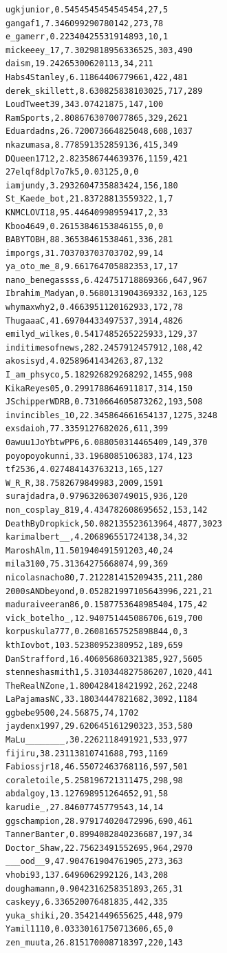 \begin{verbatim}
ugkjunior,0.5454545454545454,27,5
gangaf1,7.346099290780142,273,78
e_gamerr,0.22340425531914893,10,1
mickeeey_17,7.3029818956336525,303,490
daism,19.24265300620113,34,211
Habs4Stanley,6.11864406779661,422,481
derek_skillett,8.630825838103025,717,289
LoudTweet39,343.07421875,147,100
RamSports,2.8086763070077865,329,2621
Eduardadns,26.720073664825048,608,1037
nkazumasa,8.778591352859136,415,349
DQueen1712,2.823586744639376,1159,421
27elqf8dpl7o7k5,0.03125,0,0
iamjundy,3.2932604735883424,156,180
St_Kaede_bot,21.83728813559322,1,7
KNMCLOVI18,95.44640998959417,2,33
Kboo4649,0.26153846153846155,0,0
BABYTOBH,88.36538461538461,336,281
imporgs,31.703703703703702,99,14
ya_oto_me_8,9.661764705882353,17,17
nano_benegassss,6.424751718869366,647,967
Ibrahim_Madyan,0.5680131904369332,163,125
whymaxwhy2,0.4663951120162933,172,78
ThugaaaC,41.69704433497537,3914,4826
emilyd_wilkes,0.5417485265225933,129,37
inditimesofnews,282.2457912457912,108,42
akosisyd,4.02589641434263,87,132
I_am_phsyco,5.182926829268292,1455,908
KikaReyes05,0.2991788646911817,314,150
JSchipperWDRB,0.7310664605873262,193,508
invincibles_10,22.345864661654137,1275,3248
exsdaioh,77.3359127682026,611,399
0awuu1JoYbtwPP6,6.088050314465409,149,370
poyopoyokunni,33.1968085106383,174,123
tf2536,4.027484143763213,165,127
W_R_R,38.7582679849983,2009,1591
surajdadra,0.9796320630749015,936,120
non_cosplay_819,4.434782608695652,153,142
DeathByDropkick,50.082135523613964,4877,3023
karimalbert__,4.206896551724138,34,32
MaroshAlm,11.501940491591203,40,24
mila3100,75.31364275668074,99,369
nicolasnacho80,7.212281415209435,211,280
2000sANDbeyond,0.052821997105643996,221,21
maduraiveeran86,0.1587753648985404,175,42
vick_botelho_,12.940751445086706,619,700
korpuskula777,0.26081657525898844,0,3
kthIovbot,103.52380952380952,189,659
DanStrafford,16.406056860321385,927,5605
stenneshasmith1,5.310344827586207,1020,441
TheRealNZone,1.800428418421992,262,2248
LaPajamasNC,33.18034447821682,3092,1184
ggbebe9500,24.56875,74,1702
jaydenx1997,29.620645161290323,353,580
MaLu________,30.2262118491921,533,977
fijiru,38.23113810741688,793,1169
Fabiossjr18,46.55072463768116,597,501
coraletoile,5.258196721311475,298,98
abdalgoy,13.127698951264652,91,58
karudie_,27.84607745779543,14,14
ggschampion,28.979174020472996,690,461
TannerBanter,0.8994082840236687,197,34
Doctor_Shaw,22.75623491552695,964,2970
___ood__9,47.904761904761905,273,363
vhobi93,137.6496062992126,143,208
doughamann,0.9042316258351893,265,31
caskeyy,6.336520076481835,442,335
yuka_shiki,20.35421449655625,448,979
Yamil1110,0.03330161750713606,65,0
zen_muuta,26.815170008718397,220,143

\end{verbatim}
